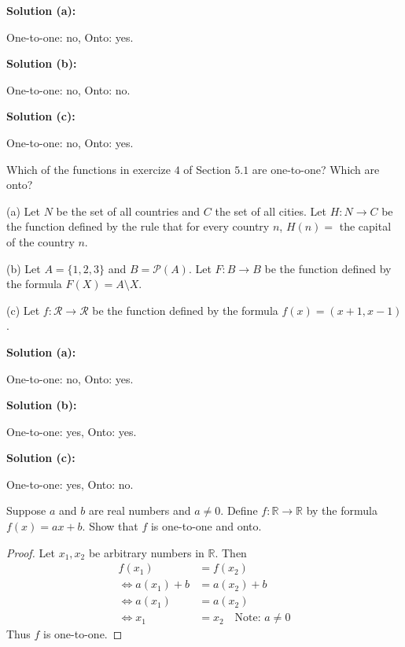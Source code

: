 \textbf{Solution (a):}
\begin{center}
    One-to-one: no, Onto: yes.
\end{center}
\textbf{Solution (b):}
\begin{center}
    One-to-one: no, Onto: no.
\end{center}
\textbf{Solution (c):}
\begin{center}
    One-to-one: no, Onto: yes.
\end{center}

\begin{tcolorbox}[title=Problem 4, breakable]
    Which of the functions in exercize $4$ of Section $5.1$
        are one-to-one? Which are onto?

    (a) Let $N$ be the set of all countries and $C$ the set of all 
        cities. Let $H : N \rightarrow C$ be the function defined by the rule 
        that for every country $n$, $H(n) =$ the capital of the country $n$.

    (b) Let $A = \{1, 2, 3\}$ and $B = \mathcal{P}(A)$.
        Let $F : B \rightarrow B$ be the function defined by the 
            formula $F(X) = A \setminus X$.

    (c) Let $f : \mathcal{R} \rightarrow \mathcal{R}$ be the function 
        defined by the formula $f(x) = (x + 1, x - 1)$.
\end{tcolorbox}

\textbf{Solution (a):}
\begin{center}
    One-to-one: no, Onto: yes.
\end{center}
\textbf{Solution (b):}
\begin{center}
    One-to-one: yes, Onto: yes.
\end{center}
\textbf{Solution (c):}
\begin{center}
    One-to-one: yes, Onto: no.
\end{center}

\begin{tcolorbox}[title=Problem 6, breakable]
    Suppose $a$ and $b$ are real numbers and $a \ne 0$. 
    Define $f : \mathbb{R} \rightarrow \mathbb{R}$ by the 
        formula $f(x) = ax + b$.
    Show that $f$ is one-to-one and onto.
\end{tcolorbox}

\begin{proof}
    Let $x_1, x_2$ be arbitrary numbers in $\mathbb{R}$.
    Then 
    \begin{align*}
        f(x_1) &= f(x_2) \\
        \iff a(x_1) + b &= a(x_2) + b \\
        \iff a(x_1) &= a(x_2) \\
        \iff x_1 &= x_2 \quad \text{Note: $a \ne 0$}
    \end{align*}
    Thus $f$ is one-to-one.
\end{proof}

